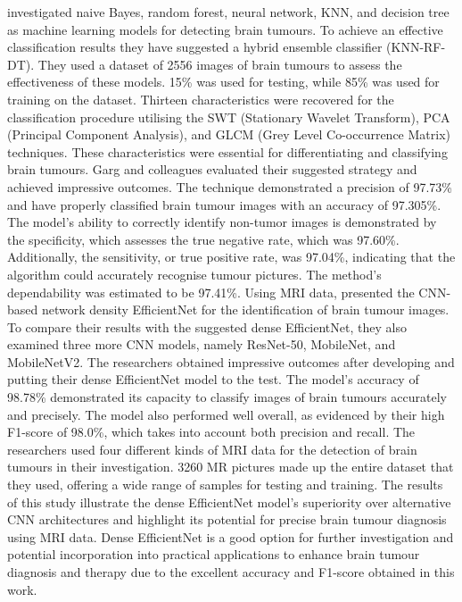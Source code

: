 \documentclass[12pt, a4paper,twoside]{report}
\theoremstyle{plain} %
\theoremstyle{definition} %
\theoremstyle{remark} %
\numberwithin{equation}{chapter}
\begin{document}
\cite{amin22} investigated naive Bayes, random forest, neural network, KNN, and decision tree as machine learning models for detecting brain tumours. To achieve an effective classification results they have suggested a hybrid ensemble classifier (KNN-RF-DT). They used a dataset of 2556 images of brain tumours to assess the effectiveness of these models. 15\% was used for testing, while 85\% was used for training on the dataset. Thirteen characteristics were recovered for the classification procedure utilising the SWT (Stationary Wavelet Transform), PCA (Principal Component Analysis), and GLCM (Grey Level Co-occurrence Matrix) techniques. These characteristics were essential for differentiating and classifying brain tumours. Garg and colleagues evaluated their suggested strategy and achieved impressive outcomes. The technique demonstrated a precision of 97.73\% and have properly classified brain tumour images with an accuracy of 97.305\%. The model's ability to correctly identify non-tumor images is demonstrated by the specificity, which assesses the true negative rate, which was 97.60\%. Additionally, the sensitivity, or true positive rate, was 97.04\%, indicating that the algorithm could accurately recognise tumour pictures. The method's dependability was estimated to be 97.41\%.
Using MRI data, \cite{nayak22} presented the CNN-based network density EfficientNet for the identification of brain tumour images. To compare their results with the suggested dense EfficientNet, they also examined three more CNN models, namely ResNet-50, MobileNet, and MobileNetV2. The researchers obtained impressive outcomes after developing and putting their dense EfficientNet model to the test. The model's accuracy of 98.78\% demonstrated its capacity to classify images of brain tumours accurately and precisely. The model also performed well overall, as evidenced by their high F1-score of 98.0\%, which takes into account both precision and recall. The researchers used four different kinds of MRI data for the detection of brain tumours in their investigation. 3260 MR pictures made up the entire dataset that they used, offering a wide range of samples for testing and training. The results of this study illustrate the dense EfficientNet model's superiority over alternative CNN architectures and highlight its potential for precise brain tumour diagnosis using MRI data. Dense EfficientNet is a good option for further investigation and potential incorporation into practical applications to enhance brain tumour diagnosis and therapy due to the excellent accuracy and F1-score obtained in this work.
\end{document}
